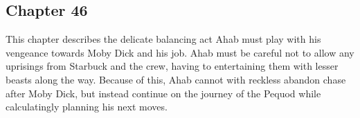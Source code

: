\subsection{Chapter 46}

This chapter describes the delicate balancing act Ahab must play with his
vengeance towards Moby Dick and his job. Ahab must be careful not to allow any
uprisings from Starbuck and the crew, having to entertaining them with lesser
beasts along the way. Because of this, Ahab cannot with reckless abandon chase
after Moby Dick, but instead continue on the journey of the Pequod while
calculatingly planning his next moves.
